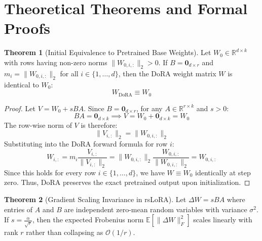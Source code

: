 \documentclass[11pt,a4paper]{article}
\theoremstyle{definition}
\newtheorem{theorem}{\textbf{Theorem}}[section]
\begin{document}
\section{Theoretical Theorems and Formal Proofs}

\begin{theorem}[Initial Equivalence to Pretrained Base Weights]
Let $W_0 \in \mathbb{R}^{d \times k}$ with rows having non-zero norms $\|W_{0, i,:}\|_2 > 0$. If $B = \mathbf{0}_{d \times r}$ and $m_i = \|W_{0, i,:}\|_2$ for all $i \in \{1, \dots, d\}$, then the DoRA weight matrix $W$ is identical to $W_0$:
{\boldmath
\begin{equation}
W_{\text{DoRA}} \equiv W_0
\end{equation}
}
\end{theorem}

\begin{proof}
Let $V = W_0 + s BA$. Since $B = \mathbf{0}_{d \times r}$, for any $A \in \mathbb{R}^{r \times k}$ and $s > 0$:
{\boldmath
\begin{equation}
BA = \mathbf{0}_{d \times k} \implies V = W_0 + \mathbf{0}_{d \times k} = W_0
\end{equation}
}
The row-wise norm of $V$ is therefore:
{\boldmath
\begin{equation}
\|V_{i,:}\|_2 = \|W_{0, i,:}\|_2
\end{equation}
}
Substituting into the DoRA forward formula for row $i$:
{\boldmath
\begin{equation}
W_{i,:} = m_i \frac{V_{i,:}}{\|V_{i,:}\|_2} = \|W_{0, i,:}\|_2 \frac{W_{0, i,:}}{\|W_{0, i,:}\|_2} = W_{0, i,:}
\end{equation}
}
Since this holds for every row $i \in \{1, \dots, d\}$, we have $W \equiv W_0$ identically at step zero. Thus, DoRA preserves the exact pretrained output upon initialization.
\end{proof}

\begin{theorem}[Gradient Scaling Invariance in rsLoRA]
Let $\Delta W = s B A$ where entries of $A$ and $B$ are independent zero-mean random variables with variance $\sigma^2$. If $s = \frac{\alpha}{\sqrt{r}}$, then the expected Frobenius norm $\mathbb{E}[\|\Delta W\|_F^2]$ scales linearly with rank $r$ rather than collapsing as $\mathcal{O}(1/r)$.
\end{theorem}
\end{document}
